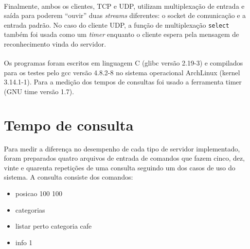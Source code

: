 \documentclass[a4paper,10pt,oneside,final,titlepage,onecolumn]{scrartcl}
\begin{document}
\paragraph{}Finalmente, ambos os clientes, TCP e UDP, utilizam multiplexação de entrada e saída para poderem ``ouvir'' duas \emph{streams} diferentes: o socket de comunicação e a entrada padrão. No caso do cliente UDP, a função de multiplexação \verb|select| também foi usada como um \emph{timer} enquanto o cliente espera pela mensagem de reconhecimento vinda do servidor.
\paragraph{}Os programas foram escritos em linguagem C (glibc versão 2.19-3) e compilados para os testes pelo gcc versão 4.8.2-8 no sistema operacional ArchLinux (kernel 3.14.1-1). Para a medição dos tempos de consultas foi usado a ferramenta timer (GNU time versão 1.7).



\FloatBarrier

\section{Tempo de consulta}
\paragraph{}Para medir a diferença no desempenho de cada tipo de servidor implementado, foram preparados quatro arquivos de entrada de comandos que fazem cinco, dez, vinte e quarenta repetições de uma consulta seguindo um dos casos de uso do sistema. A consulta consiste dos comandos:
\begin{itemize}
 \item  posicao 100 100
 \item categorias
 \item listar perto categoria cafe
 \item info 1
\end{itemize}
\end{document}
